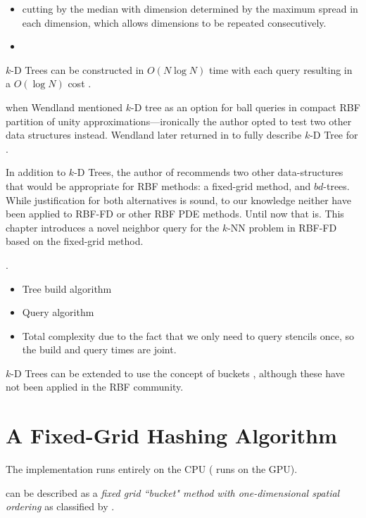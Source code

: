\documentclass{report}
\begin{document}
\begin{itemize} 
\item cutting by the median with dimension determined by the maximum spread in each dimension, which allows dimensions to be repeated consecutively. 
\item 
\end{itemize}


$k$-D Trees can be constructed in $O(N \log N)$ time with each query resulting in a $O(\log N)$ cost \cite{WendlandBook}.


 when Wendland mentioned $k$-D tree as an option for ball queries in compact RBF partition of unity approximations---ironically the author opted to test two other data structures instead. Wendland later returned in \cite{WendlandBook} to fully describe $k$-D Tree for . 


In addition to $k$-D Trees, the author of \cite{WendlandBook} recommends two other data-structures that would be appropriate for RBF methods: a fixed-grid method, and $bd$-trees. While justification for both alternatives is sound, to our knowledge neither have been applied to RBF-FD or other RBF PDE methods. Until now that is. This chapter introduces a novel neighbor query for the $k$-NN problem in RBF-FD based on the fixed-grid method. 

\cite{TagliasacchiMFE}. 
\cite{MatlabKDTreeSearcher}




\begin{itemize} 
\item Tree build algorithm
\item Query algorithm
\item Total complexity due to the fact that we only need to query stencils once, so the build and query times are joint. 
\end{itemize}
\cite{Fasshauer2007}

$k$-D Trees can be extended to use the concept of buckets \cite{Friedman1977}, although these have not been applied in the RBF community. 



\section{A Fixed-Grid Hashing Algorithm}

The implementation runs entirely on the CPU (\cite{Krog2010} runs on the GPU). 


 can be described as a \emph{fixed grid ``bucket" method with one-dimensional spatial ordering} as classified by \cite{Samet2005}. 
\end{document}
